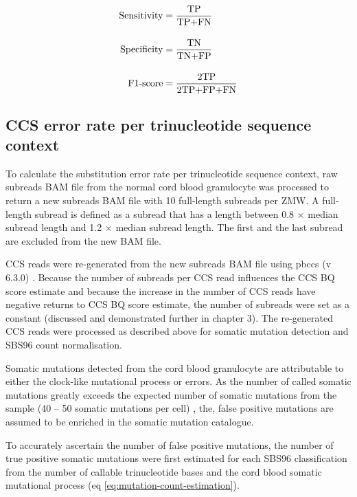 \begin{equation}
\begin{aligned} 
\text{Sensitivity} &= \frac{\text{TP}}{\text{TP+FN}} \\[1em] 
\bigskip \text{Specificity} &= \frac{\text{TN}}{\text{TN+FP}} \\[1em] 
\text{F1-score} &= \frac{\text{2TP}}{\text{2TP+FP+FN}}
\end{aligned}
\label{eq:sensitivity-specificity}
\end{equation}



\subsection{CCS error rate per trinucleotide sequence context}

To calculate the substitution error rate per trinucleotide sequence context, raw subreads BAM file from the normal cord blood granulocyte was processed to return a new subreads BAM file with 10 full-length subreads per ZMW. A full-length subread is defined as a subread that has a length between 0.8 $\times$ median subread length and 1.2 $\times$ median subread length. The first and the last subread are excluded from the new BAM file. 

CCS reads were re-generated from the new subreads BAM file using pbccs (v 6.3.0) \cite{}. Because the number of subreads per CCS read influences the CCS BQ score estimate and because the increase in the number of CCS reads have negative returns to CCS BQ score estimate, the number of subreads were set as a constant (discussed and demonstrated further in chapter 3). The re-generated CCS reads were processed as described above for somatic mutation detection and SBS96 count normalisation. 

Somatic mutations detected from the cord blood granulocyte are attributable to either the clock-like mutational process or errors. As the number of called somatic mutations greatly exceeds the expected number of somatic mutations from the sample (40 – 50 somatic mutations per cell) \cite{Osorio2018-mh, Mitchell2022-ry}, the, false positive mutations are assumed to be enriched in the somatic mutation catalogue. 
 
To accurately ascertain the number of false positive mutations, the number of true positive somatic mutations were first estimated for each SBS96 classification from the number of callable trinucleotide bases and the cord blood somatic mutational process (eq \ref{eq:mutation-count-estimation}). 

